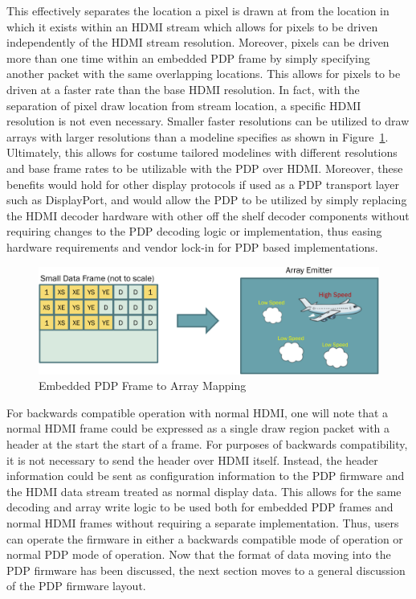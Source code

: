     This effectively separates the location a pixel is drawn at from the location in which it exists within an HDMI stream which allows for pixels to be driven independently of the HDMI stream resolution. Moreover, pixels can be driven more than one time within an embedded PDP frame by simply specifying another packet with the same overlapping locations. This allows for pixels to be driven at a faster rate than the base HDMI resolution. In fact, with the separation of pixel draw location from stream location, a specific HDMI resolution is not even necessary. Smaller faster resolutions can be utilized to draw arrays with larger resolutions than a modeline specifies as shown in Figure~\ref{fig:embedded_frame_to_emitter}. Ultimately, this allows for costume tailored modelines with different resolutions and base frame rates to be utilizable with the PDP over HDMI. Moreover, these benefits would hold for other display protocols if used as a PDP transport layer such as DisplayPort, and would allow the PDP to be utilized by simply replacing the HDMI decoder hardware with other off the shelf decoder components without requiring changes to the PDP decoding logic or implementation, thus easing hardware requirements and vendor lock-in for PDP based implementations.

    \begin{figure}
        \centering
        \includegraphics[width=1.0\textwidth]{fig/embedded_frame_to_emitter.pdf}
        \caption{Embedded PDP Frame to Array Mapping}
        \label{fig:embedded_frame_to_emitter}
    \end{figure}

    For backwards compatible operation with normal HDMI, one will note that a normal HDMI frame could be expressed as a single draw region packet with a header at the start the start of a frame. For purposes of backwards compatibility, it is not necessary to send the header over HDMI itself. Instead, the header information could be sent as configuration information to the PDP firmware and the HDMI data stream treated as normal display data. This allows for the same decoding and array write logic to be used both for embedded PDP frames and normal HDMI frames without requiring a separate implementation. Thus, users can operate the firmware in either a backwards compatible mode of operation or normal PDP mode of operation. Now that the format of data moving into the PDP firmware has been discussed, the next section moves to a general discussion of the PDP firmware layout.

